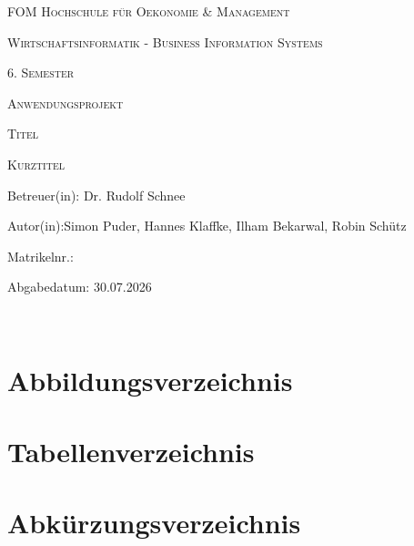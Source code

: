\documentclass[12pt]{article}
\begin{document}
\raggedbottom
\justifying
\setlength{\emergencystretch}{10pt}
\thispagestyle{empty}
    {\scshape\large FOM Hochschule für Oekonomie \& Management \par}
    \vspace{1cm}
    {\scshape\large Wirtschaftsinformatik - Business Information Systems\par}
    \vspace{1cm}
    {\scshape\large 6. Semester \par}
    \vspace{1cm}
    {\scshape\large Anwendungsprojekt\par}
    \vspace{1cm}
    {\scshape\large Titel\par}
    {\scshape\large Kurztitel \par}
    \vspace{6cm}
    {\textsc\Large Betreuer(in): Dr. Rudolf Schnee\par}
    \vspace{1cm}
    {\textsc\Large Autor(in):Simon Puder, Hannes Klaffke, Ilham Bekarwal, Robin Schütz\par}
    \vspace{1cm}
    {\textsc\Large Matrikelnr.: \par}
    \vspace{1cm}
    {\textsc\Large Abgabedatum: 30.07.2026\par}
    \vspace{1cm}
\newpage
{}
\setcounter{page}{2}
\tableofcontents
\
\newpage
\section*{Abbildungsverzeichnis}
\renewcommand{\listfigurename}{}%
\vspace*{-2\baselineskip}       %
\listoffigures

\section*{Tabellenverzeichnis}
\renewcommand{\listtablename}{} %
\vspace*{-2\baselineskip}       %
\listoftables
\newpage
{}
\section*{Abkürzungsverzeichnis}
\end{document}
